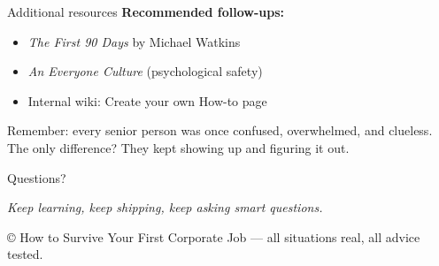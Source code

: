 \documentclass[aspectratio=169, 11pt]{beamer}
\begin{document}
	\begin{frame}{Additional resources}
		\textbf{Recommended follow-ups:}
		\begin{itemize}
			\item \textit{The First 90 Days} by Michael Watkins
			\item \textit{An Everyone Culture} (psychological safety)
			\item Internal wiki: Create your own  How-to  page
		\end{itemize}
		\vspace{0.3cm}
		\small{Remember: every senior person was once confused, overwhelmed, and clueless. The only difference? They kept showing up and figuring it out.}
	\end{frame}
	
	\begin{frame}{}
		\centering
		\vspace{1cm}
		{\Huge Questions?}
		\vspace{0.5cm}
		
		\textit{Keep learning, keep shipping, keep asking smart questions.}
		\vspace{1cm}
		
		\small{© How to Survive Your First Corporate Job — all situations real, all advice tested.}
	\end{frame}
	
\end{document}
